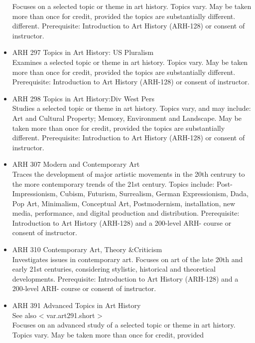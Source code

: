 \documentclass[
  letterpaper,
]{scrbook}
\begin{document}
\begin{itemize}
  Focuses on a selected topic or theme in art history. Topics vary. May
  be taken more than once for credit, provided the topics are
  substantially different. different. Prerequisite: Introduction to Art
  History (ARH-128) or consent of instructor.\\
\item
  ARH 297 Topics in Art History: US Pluralism\\
  Examines a selected topic or theme in art history. Topics vary. May be
  taken more than once for credit, provided the topics are substantially
  different. Prerequisite: Introduction to Art History (ARH-128) or
  consent of instructor.\\
\item
  ARH 298 Topics in Art History:Div West Pers\\
  Studies a selected topic or theme in art history. Topics vary, and may
  include: Art and Cultural Property; Memory, Environment and Landscape.
  May be taken more than once for credit, provided the topics are
  substantially different. Prerequisite: Introduction to Art History
  (ARH-128) or consent of instructor.\\
\item
  ARH 307 Modern and Contemporary Art\\
  Traces the development of major artistic movements in the 20th
  centrury to the more contemporary trends of the 21st century. Topics
  include: Post-Impressionism, Cubism, Futurism, Surrealism, German
  Expressionism, Dada, Pop Art, Minimalism, Conceptual Art,
  Postmodernism, installation, new media, performance, and digital
  production and distribution. Prerequisite: Introduction to Art History
  (ARH-128) and a 200-level ARH- course or consent of instructor.\\
\item
  ARH 310 Contemporary Art, Theory \&Criticism\\
  Investigates issues in contemporary art. Focuses on art of the late
  20th and early 21st centuries, considering stylistic, historical and
  theoretical developments. Prerequisite: Introduction to Art History
  (ARH-128) and a 200-level ARH- course or consent of instructor.\\
\item
  ARH 391 Advanced Topics in Art History\\
  See also {{< var.art291.short  >}}\\
  Focuses on an advanced study of a selected topic or theme in art
  history. Topics vary. May be taken more than once for credit, provided

\end{itemize}
\end{document}
